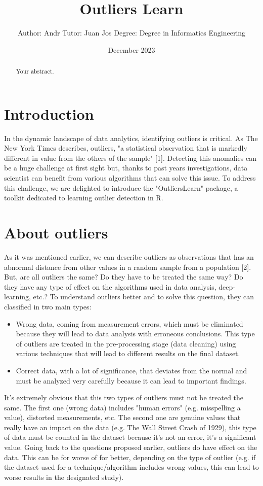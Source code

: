 \documentclass{article}
\title{Outliers Learn}
\author{
  \normalsize Author: Andr
  \normalsize Tutor: Juan Jos
  \normalsize Degree: Degree in Informatics Engineering
}
\date{December 2023}
\begin{document}

\maketitle

\begin{abstract}
Your abstract.
\end{abstract}

\section{Introduction}
In the dynamic landscape of data analytics, identifying outliers is critical. As The New York Times describes, outliers, "a statistical observation that is markedly different in value from the others of the sample" \label{intro:nytimes}[1].
Detecting this anomalies can be a huge challenge at first sight but, thanks to past years investigations, data scientist can benefit from various algorithms that can solve this issue.
To address this challenge, we are delighted to introduce the "OutliersLearn" package, a toolkit dedicated to learning outlier detection in R.

\section{About outliers}
As it was mentioned earlier, we can describe outliers as observations that has an abnormal distance from other values in a random sample from a population \label{outliers:definition}[2]. But, are all outliers the same? Do they have to be treated the same way? Do they have any type of effect on the algorithms used in data analysis, deep-learning, etc.?
To understand outliers better and to solve this question, they can classified in two main types:
\begin{itemize}
    \item Wrong data, coming from measurement errors, which must be eliminated because they will lead to data analysis with erroneous conclusions. This type of outliers are treated in the pre-processing stage (data cleaning) using various techniques that will lead to different results on the final dataset.
    \item Correct data, with a lot of significance, that deviates from the normal and must be analyzed very carefully because it can lead to important findings.
\end{itemize}

It's extremely obvious that this two types of outliers must not be treated the same. The first one (wrong data) includes "human errors" (e.g. misspelling a value), distorted measurements, etc. The second one are genuine values that really have an impact on the data (e.g. The Wall Street Crash of 1929), this type of data must be counted in the dataset because it's not an error, it's a significant value.
Going back to the questions proposed earlier, outliers do have effect on the data. This can be for worse of for better, depending on the type of outlier (e.g. if the dataset used for a technique/algorithm includes wrong values, this can lead to worse results in the designated study).
\end{document}
